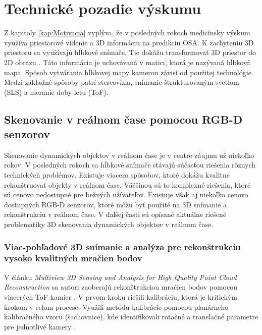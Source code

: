 
\chapter{Technické pozadie výskumu} 
\label{kap:technické_pozadie}
\pagestyle{fancy}
\fancyhf{}
\fancyfoot[CE,CO]{\thepage}
\renewcommand{\footrulewidth}{1pt}

Z kapitoly \ref{kap:Motivacia} vyplýva, že v posledných rokoch medicínsky výskum využíva priestorové videnie a 3D informáciu na predikciu OSA. K zachyteniu 3D priestoru sa využívajú hĺbkové snímače. Tie dokážu transformovať 3D priestor do 2D obrazu \cite{Malik_Choi_2008}. Táto informácia je uchovávaná v matici, ktorá je nazývaná hĺbková mapa. Spôsob vytvárania hĺbkovej mapy kamerou závisí od použitej technológie. Medzi základné spôsoby patrí stereovízia, snímanie štrukturovaným svetlom (SLS) a meranie doby letu (ToF). 

\section{Skenovanie v reálnom čase pomocou \mbox{RGB-D} senzorov}

Skenovanie dynamických objektov v reálnom čase je v centre záujmu už niekoľko rokov. V posledných rokoch sa hĺbkové snímače stávajú súčasťou riešenia rôznych technických problémov. Existuje viacero spôsobov, ktoré dokážu kvalitne rekonštruovať objekty v reálnom čase. Väčšinou sú to komplexné riešenia, ktoré sú cenovo nedostupné pre bežných užívateľov. Existuje však aj niekoľko cenovo dostupných RGB-D senzorov, ktoré môžu byť použité na 3D snímanie a rekonštrukciu v reálnom čase. V ďalšej časti sú opísané aktuálne riešené problematiky 3D skenovania dynamických objektov v reálnom čase. 

\newpage
\subsection{Viac-pohľadové 3D snímanie a analýza pre rekonštrukciu vysoko kvalitných mračien bodov}

V článku \textit{Multiview 3D Sensing and Analysis for High Quality Point Cloud Reconstruction} sa autori zaoberajú rekonštrukciou mračien bodov pomocou viacerých ToF kamier \cite{satnik2018multiview}. 
V prvom kroku riešili kalibráciu, ktorá je kritickým krokom v celom procese. Využili metódu kalibrácie pomocou planárneho kalibračného vzoru (šachovnice), kde identifikovali rotačné a translačné parametre pre jednotlivé kamery \cite{zhang2000flexible}. 

